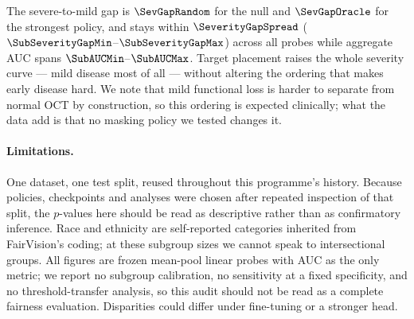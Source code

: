 The severe-to-mild gap is $\SevGapRandom$ for the null and $\SevGapOracle$ for
the strongest policy, and stays within $\SeverityGapSpread$
($\SubSeverityGapMin$--$\SubSeverityGapMax$) across all \NprobesSub{} probes
while aggregate AUC spans $\SubAUCMin$--$\SubAUCMax$. Target placement raises
the whole severity curve --- mild disease most of all --- without altering the
ordering that makes early disease hard. We note that mild functional loss is
harder to separate from normal OCT by construction, so this ordering is expected
clinically; what the data add is that no masking policy we tested changes it.

\paragraph{Limitations.} One dataset, one test split, reused throughout this
programme's history. Because policies, checkpoints and analyses were chosen
after repeated inspection of that split, the $p$-values here should be read as
descriptive rather than as confirmatory inference. Race and ethnicity are
self-reported categories inherited from FairVision's coding; at these subgroup
sizes we cannot speak to intersectional groups. All figures are frozen mean-pool
linear probes with AUC as the only metric; we report no subgroup calibration,
no sensitivity at a fixed specificity, and no threshold-transfer analysis, so
this audit should not be read as a complete fairness evaluation. Disparities
could differ under fine-tuning or a stronger head.

